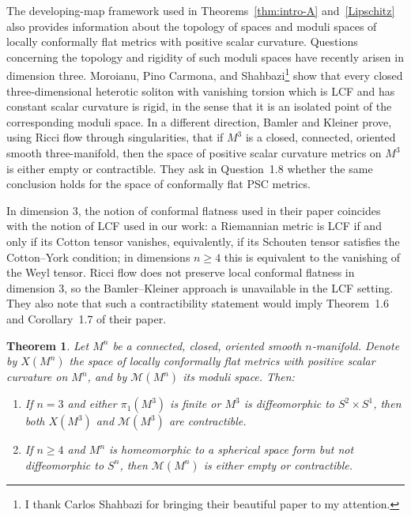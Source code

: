 \documentclass[12pt,oneside,a4paper]{article}
\newtheorem{theoremD}{Theorem}
\theoremstyle{mytheorem}
\theoremstyle{remark}
\theoremstyle{definition}
\begin{document}
The developing-map framework used in
Theorems~\ref{thm:intro-A} and~\ref{Lipschitz} also provides information
about the topology of spaces and moduli spaces of locally conformally flat
metrics with positive scalar curvature. Questions concerning the topology and rigidity of such moduli spaces have recently arisen in dimension three.
Moroianu, Pino Carmona, and
Shahbazi\footnote{I thank Carlos Shahbazi for bringing their beautiful paper to my attention.}
\cite{2026arXiv260303272M} show that every closed three-dimensional
heterotic soliton with vanishing torsion which is LCF and has constant scalar curvature is rigid, in the sense that it is an isolated point of the
corresponding moduli space.  In a different direction, Bamler and Kleiner
\cite{2019arXiv190908710B} prove, using Ricci flow through singularities,
that if \(M^3\) is a closed, connected, oriented smooth three-manifold, then
the space of positive scalar curvature metrics on \(M^3\) is either empty or
contractible.    They ask in Question~1.8 whether the same conclusion holds for the space of conformally flat PSC metrics.





 

  In dimension $3$, the notion of conformal flatness used
in their paper coincides with the notion of LCF used in our work:
a Riemannian metric is LCF if and only if its Cotton tensor vanishes,
equivalently, if its Schouten tensor satisfies the Cotton--York
condition; in dimensions $n\ge 4$ this is equivalent to the vanishing
of the Weyl tensor.  Ricci flow does not preserve local conformal
flatness in dimension $3$, so the Bamler--Kleiner approach is
unavailable in the LCF setting.  They also note that such a contractibility statement would imply Theorem~1.6 and Corollary~1.7 of their paper.


\begin{theoremD}\label{thm:intro-D}
Let $M^n$ be a connected, closed, oriented smooth $n$-manifold. Denote by $X(M^n)$ the space of locally conformally flat metrics with positive scalar curvature on $M^n$, and by $\mathcal{M}(M^n)$ its moduli space. Then:
\begin{enumerate}
\item[(i)] If $n = 3$ and either $\pi_1(M^3)$ is finite or $M^3$ is diffeomorphic to $S^2 \times S^1$, then both $X(M^3)$ and $\mathcal{M}(M^3)$ are contractible.
\item[(ii)] If $n \ge 4$ and $M^n$ is homeomorphic to a spherical space form but not diffeomorphic to $S^n$, then $\mathcal{M}(M^n)$ is either empty or contractible.
\end{enumerate}
\end{theoremD}
\end{document}
